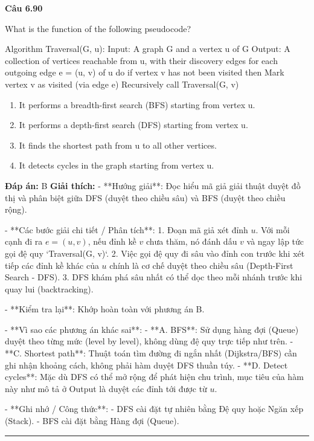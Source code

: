 \documentclass[11pt,a4paper]{article}
\newenvironment{question}[1]{%
  \par\vspace{1em}\noindent\textbf{\large Câu #1}\par\vspace{0.4em}
}{%
  \par\vspace{1em}\hrule\vspace{0.6em}
}
\newenvironment{choices}{%
  \begin{enumerate}[label=\textbf{\Alph*.},leftmargin=2.2em,itemsep=2pt,topsep=3pt]
}{%
  \end{enumerate}
}
\newcommand{\choice}{\item}
\newenvironment{codebox}{%
  \begin{tcolorbox}[colback=gray!8!white,colframe=gray!50!black,arc=1.5mm,boxrule=0.6pt,left=3mm,right=3mm,top=2.5mm,bottom=2.5mm]
  \ttfamily\small
}{%
  \end{tcolorbox}
}
\begin{document}
\begin{question}{6.90}
What is the function of the following pseudocode?
\begin{codebox}
Algorithm Traversal(G, u):
    Input: A graph G and a vertex u of G
    Output: A collection of vertices reachable from u, with their discovery edges
    for each outgoing edge e = (u, v) of u do
        if vertex v has not been visited then
            Mark vertex v as visited (via edge e)
            Recursively call Traversal(G, v)
\end{codebox}
\begin{choices}
\choice It performs a breadth-first search (BFS) starting from vertex u.
\choice It performs a depth-first search (DFS) starting from vertex u.
\choice It finds the shortest path from u to all other vertices.
\choice It detects cycles in the graph starting from vertex u.
\end{choices}
\textbf{Đáp án:} B
\textbf{Giải thích:} - **Hướng giải**:
  Đọc hiểu mã giả giải thuật duyệt đồ thị và phân biệt giữa DFS (duyệt theo chiều sâu) và BFS (duyệt theo chiều rộng).

- **Các bước giải chi tiết / Phân tích**:
  1. Đoạn mã giả xét đỉnh \(u\). Với mỗi cạnh đi ra \(e = (u, v)\), nếu đỉnh kề \(v\) chưa thăm, nó đánh dấu \(v\) và ngay lập tức gọi đệ quy `Traversal(G, v)`.
  2. Việc gọi đệ quy đi sâu vào đỉnh con trước khi xét tiếp các đỉnh kề khác của \(u\) chính là cơ chế duyệt theo chiều sâu (Depth-First Search - DFS).
  3. DFS khám phá sâu nhất có thể dọc theo mỗi nhánh trước khi quay lui (backtracking).

- **Kiểm tra lại**:
  Khớp hoàn toàn với phương án B.

- **Vì sao các phương án khác sai**:
  - **A. BFS**: Sử dụng hàng đợi (Queue) duyệt theo từng mức (level by level), không dùng đệ quy trực tiếp như trên.
  - **C. Shortest path**: Thuật toán tìm đường đi ngắn nhất (Dijkstra/BFS) cần ghi nhận khoảng cách, không phải hàm duyệt DFS thuần túy.
  - **D. Detect cycles**: Mặc dù DFS có thể mở rộng để phát hiện chu trình, mục tiêu của hàm này như mô tả ở Output là duyệt các đỉnh tới được từ \(u\).

- **Ghi nhớ / Công thức**:
  - DFS cài đặt tự nhiên bằng Đệ quy hoặc Ngăn xếp (Stack).
  - BFS cài đặt bằng Hàng đợi (Queue).
\end{question}
\end{document}
